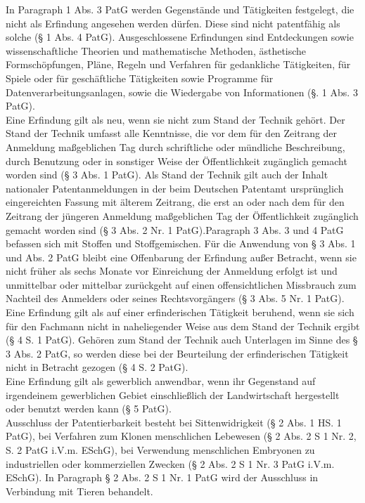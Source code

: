 In Paragraph 1 Abs. 3 PatG werden Gegenstände und Tätigkeiten festgelegt, die nicht als Erfindung angesehen werden dürfen. Diese sind nicht patentfähig als solche (§ 1 Abs. 4 PatG). Ausgeschlossene Erfindungen sind Entdeckungen sowie wissenschaftliche Theorien und mathematische Methoden, ästhetische Formschöpfungen, Pläne, Regeln und Verfahren für gedankliche Tätigkeiten, für Spiele oder für geschäftliche Tätigkeiten sowie Programme für Datenverarbeitungsanlagen, sowie die Wiedergabe von Informationen (§. 1 Abs. 3 PatG). 
\\

Eine Erfindung gilt als neu, wenn sie nicht zum Stand der Technik gehört. Der
Stand der Technik umfasst alle Kenntnisse, die vor dem für den Zeitrang der Anmeldung
maßgeblichen Tag durch schriftliche oder mündliche Beschreibung, durch Benutzung oder in
sonstiger Weise der Öffentlichkeit zugänglich gemacht worden sind (§ 3 Abs. 1 PatG).
Als Stand der Technik gilt auch der Inhalt nationaler Patentanmeldungen in der beim Deutschen
Patentamt ursprünglich eingereichten Fassung mit älterem Zeitrang, die erst an oder nach dem für
den Zeitrang der jüngeren Anmeldung maßgeblichen Tag der Öffentlichkeit zugänglich gemacht
worden sind (§ 3 Abs. 2 Nr. 1 PatG).Paragraph 3 Abs. 3 und 4 PatG befassen sich mit Stoffen und Stoffgemischen. Für die Anwendung von § 3 Abs. 1 und Abs. 2 PatG bleibt eine Offenbarung der Erfindung außer Betracht, wenn sie nicht früher als sechs Monate vor Einreichung der Anmeldung erfolgt ist und
unmittelbar oder mittelbar zurückgeht auf einen offensichtlichen Missbrauch zum Nachteil des
Anmelders oder seines Rechtsvorgängers (§ 3 Abs. 5 Nr. 1 PatG).
\\

Eine Erfindung gilt als auf einer erfinderischen Tätigkeit beruhend, wenn sie sich für den Fachmann
nicht in naheliegender Weise aus dem Stand der Technik ergibt (§ 4 S. 1 PatG). Gehören zum Stand
der Technik auch Unterlagen im Sinne des § 3 Abs. 2 PatG, so werden diese bei der Beurteilung der
erfinderischen Tätigkeit nicht in Betracht gezogen (§ 4 S. 2 PatG).
\\

Eine Erfindung gilt als gewerblich anwendbar, wenn ihr Gegenstand auf irgendeinem gewerblichen
Gebiet einschließlich der Landwirtschaft hergestellt oder benutzt werden kann (§ 5 PatG).
\\

Ausschluss der Patentierbarkeit besteht bei Sittenwidrigkeit (§ 2 Abs. 1 HS. 1 PatG), bei Verfahren zum Klonen menschlichen Lebewesen (§ 2 Abs. 2 S 1 Nr. 2, S. 2 PatG i.V.m. ESchG), bei Verwendung menschlichen Embryonen zu industriellen oder kommerziellen Zwecken (§ 2 Abs. 2 S 1 Nr. 3 PatG i.V.m. ESchG). In Paragraph § 2 Abs. 2 S 1 Nr. 1 PatG wird der Ausschluss in Verbindung mit Tieren behandelt.




